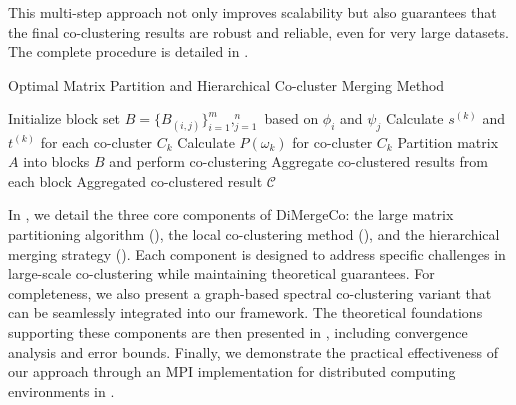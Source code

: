 \documentclass[journal]{IEEEtran}
\begin{document}
This multi-step approach not only improves scalability but also guarantees that the final co-clustering results are robust and reliable, even for very large datasets. The complete procedure is detailed in .

\begin{algorithm}[!t]
    \caption{Optimal Matrix Partition and Hierarchical Co-cluster Merging Method}\label{alg:method}
    \begin{algorithmic}[1]
        \STATE Initialize block set $B = \{B_{(i,j)}\}_{i=1}^m,_{j=1}^n$ based on $\phi_i$ and $\psi_j$
        \STATE Calculate $s^{(k)}$ and $t^{(k)}$ for each co-cluster $C_k$
        \STATE Calculate $P(\omega_k)$ for co-cluster $C_k$
        \STATE Partition matrix $A$ into blocks $B$ and perform co-clustering
        \STATE Aggregate co-clustered results from each block
        \ENDIF
        \ENDFOR
        \RETURN Aggregated co-clustered result $\mathcal{C}$
    \end{algorithmic}
\end{algorithm}

In , we detail the three core components of DiMergeCo: the large matrix partitioning algorithm (), the local co-clustering method (), and the hierarchical merging strategy (). Each component is designed to address specific challenges in large-scale co-clustering while maintaining theoretical guarantees. For completeness, we also present a graph-based spectral co-clustering variant that can be seamlessly integrated into our framework. The theoretical foundations supporting these components are then presented in , including convergence analysis and error bounds. Finally, we demonstrate the practical effectiveness of our approach through an MPI implementation for distributed computing environments in .
\end{document}
